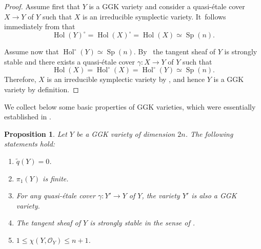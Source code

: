 \documentclass[10pt]{amsart}
\theoremstyle{plain}
\newtheorem{prop}[thm]{Proposition}
\theoremstyle{definition}
\newcommand{\OO}{\mathcal{O}}
\DeclareMathOperator{\Hol}{Hol}
\DeclareMathOperator{\Sp}{Sp}
\begin{document}
\begin{proof}
Assume first that $Y$ is a GGK variety and consider a quasi-étale cover $X \to Y$ of $Y$ such that $X$ is an irreducible symplectic variety. It~follows immediately from \cite[Rem.\,5.2 \& Prop.\,F, (F.4)--(F.6)]{GGK19} that\vspace*{-3pt}\enlargethispage{.5\baselineskip}
\[
\Hol(Y)^\circ = \Hol(X)^\circ = \Hol(X) \simeq \Sp(n).
\]

Assume now that $\Hol^\circ(Y) \simeq \Sp(n)$. By~\cite[Th.\,12.1]{GGK19} the tangent sheaf of $Y$ is strongly stable and there exists a quasi-étale cover $\gamma \colon X \to Y$ of $Y$ such that\vspace*{-3pt}
\[
\Hol(X) = \Hol^\circ(X) = \Hol^\circ(Y) \simeq \Sp(n).
\]
Therefore, $X$ is an irreducible symplectic variety by \cite[Prop.\,F, (F.4)--(F.6)]{GGK19}, and hence $Y$ is a GGK variety by definition.
\end{proof}

We collect below some basic properties of GGK varieties, which were essentially established in \cite{GKP16b,GGK19}.

\begin{prop}
\label{prop:basic_prop_GGK}
Let $Y$ be a GGK variety of dimension $2n$. The following statements hold:\vspace*{-3pt}
\begin{enumerate}
\item\label{prop:basic_prop_GGKi}
$\widetilde{q}(Y) = 0$.

\item\label{prop:basic_prop_GGKii}
$\pi_1(Y)$ is finite.

\item\label{prop:basic_prop_GGKiii}
For any quasi-étale cover $\gamma \colon Y' \to Y$ of $Y$, the variety $Y'$ is also a GGK variety.

\item\label{prop:basic_prop_GGKiv}
The tangent sheaf of $Y$ is strongly stable in the sense of \cite[Def.\,7.2]{GKP16b}.

\item\label{prop:basic_prop_GGKv}
$1 \leq \chi(Y, \OO_Y) \leq n+1$.
\end{enumerate}
\end{prop}
\end{document}
